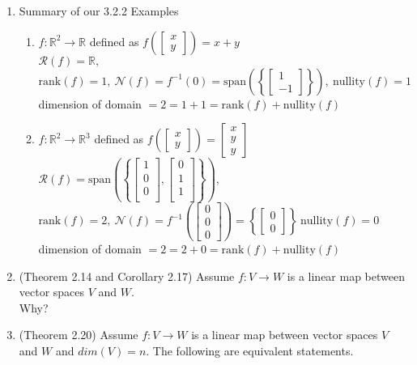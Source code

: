 \documentclass[11pt,fleqn]{article}
\begin{document}
\renewcommand{\headrulewidth}{0pt}
\newcommand{\blank}[1]{\rule{#1}{0.75pt}}
\renewcommand{\d}{\displaystyle}

\newcommand{\bpm}{\begin{pmatrix}}
\newcommand{\epm}{\end{pmatrix}}
\newcommand{\bbm}{\begin{bmatrix}}
\newcommand{\ebm}{\end{bmatrix}}

\vspace*{-0.7in}

\begin{center}
  \large {}
\end{center}

\begin{enumerate}
\item Summary of our 3.2.2 Examples
	\begin{enumerate}
	\item $f: \mathbb{R}^2 \to \mathbb{R}$ defined as $f\left(\bbm x \\y \ebm\right)= x+y$\\
	$\mathcal{R}(f)=\mathbb{R},\:$ $\text{rank}(f)=1, \: \mathcal{N}(f)=f^{-1}(0)=\text{span}\left( \left\{ \bbm 1 \\ -1 \ebm \right\}\right), \:\text{nullity}(f)=1$\\
	dimension of domain $= 2=1+1= \text{rank}(f) + \text{nullity}(f)$\\
	
	\item $f: \mathbb{R}^2 \to \mathbb{R}^3$ defined as $f\left(\bbm x \\y \ebm\right)=\bbm x\\y\\y \ebm$\\
	$\mathcal{R}(f)=\text{span}\left( \left\{ \bbm 1\\0\\0\\ \ebm, \bbm 0\\ 1\\1\\ \ebm \right\} \right),\:$ $\text{rank}(f)=2, \: \mathcal{N}(f)=f^{-1}(\bbm 0\\0\\0 \ebm)= \left\{ \bbm 0 \\ 0 \ebm \right\} \:\text{nullity}(f)=0$\\
	dimension of domain $= 2= 2+0=\text{rank}(f) + \text{nullity}(f)$\\
	\end{enumerate}
\item (Theorem 2.14 and Corollary 2.17) Assume $f:V \to W$ is a linear map between vector spaces $V$ and $W.$
\vspace{0.7in}\\
Why?\\
\vfill
\item (Theorem 2.20) Assume $f:V \to W$ is a linear map between vector spaces $V$ and $W$ and $dim(V)=n.$ The following are equivalent statements.\\


\end{enumerate}
\end{document}
